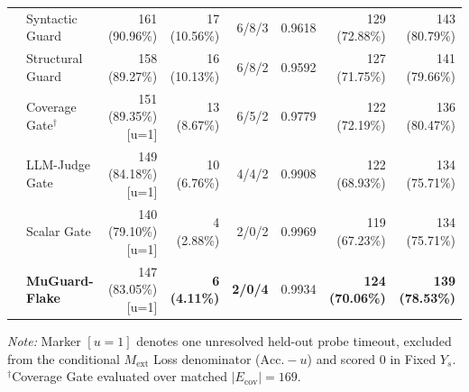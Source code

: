 \begin{table}[t]
\begin{tabular}{llrrrrrr}
 & Syntactic Guard & 161 (90.96\%) & 17 (10.56\%) & 6/8/3 & 0.9618 & 129 (72.88\%) & 143 (80.79\%) \\
 & Structural Guard & 158 (89.27\%) & 16 (10.13\%) & 6/8/2 & 0.9592 & 127 (71.75\%) & 141 (79.66\%) \\
 & Coverage Gate$^{\dagger}$ & 151 (89.35\%) [u=1] & 13 (8.67\%) & 6/5/2 & 0.9779 & 122 (72.19\%) & 136 (80.47\%) \\
 & LLM-Judge Gate & 149 (84.18\%) [u=1] & 10 (6.76\%) & 4/4/2 & 0.9908 & 122 (68.93\%) & 134 (75.71\%) \\
 & Scalar Gate & 140 (79.10\%) [u=1] & 4 (2.88\%) & 2/0/2 & 0.9969 & 119 (67.23\%) & 134 (75.71\%) \\
 & \textbf{MuGuard-Flake} & 147 (83.05\%) [u=1] & \textbf{6 (4.11\%)} & \textbf{2/0/4} & 0.9934 & \textbf{124 (70.06\%)} & \textbf{139 (78.53\%)} \\
\bottomrule
\end{tabular}
\par\smallskip\parbox{0.97\textwidth}{\scriptsize\textit{Note:} Marker $[u=1]$ denotes one unresolved held-out probe timeout, excluded from the conditional $M_{\text{ext}}$ Loss denominator ($\text{Acc.} - u$) and scored $0$ in Fixed $Y_s$. $^{\dagger}$Coverage Gate evaluated over matched $|E_{\text{cov}}|=169$.}
\end{table}
